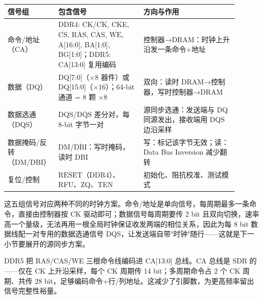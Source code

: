 \begin{longtable}{L{0.14\linewidth}L{0.36\linewidth}L{0.4\linewidth}}
\toprule
信号组 & 包含信号 & 方向与作用 \\
\midrule
命令/地址（CA） & DDR4: CK/$\overline{\text{CK}}$, CKE, $\overline{\text{CS}}$, $\overline{\text{RAS}}$, $\overline{\text{CAS}}$, $\overline{\text{WE}}$, A[16:0], BA[1:0], BG[1:0]；DDR5: CA[13:0] 复用编码 & 控制器→DRAM：时钟上升沿发一条命令+地址 \\
数据（DQ） & DQ[7:0]（$\times$8 器件）或 DQ[15:0]（$\times$16）；64-bit 通道 = 8 颗 $\times$8 & 双向：读时 DRAM→控制器，写时控制器→DRAM \\
数据选通（DQS） & DQS/$\overline{\text{DQS}}$ 差分对，每 8-bit 字节一对 & 源同步选通：发送端与 DQ 同源发出，接收端用 DQS 边沿采样 \\
数据掩码/反转（DM/DBI） & DM/$\overline{\text{DBI}}$：写时掩码，读时 DBI & 写：标记该字节无效；读：Data Bus Inversion 减少翻转 \\
复位/控制 & $\overline{\text{RESET}}$（DDR4）、RFU、ZQ、TEN & 初始化、阻抗校准、测试模式 \\
\bottomrule
\end{longtable}

这五组信号对应两种不同的时钟方案。命令/地址是单向信号，每周期最多一条命令，直接由控制器按 CK 驱动即可；数据信号每周期要传 2 bit 且双向切换，速率高一个量级，无法再用一根全局时钟保证收发两端的相位关系，因此为每 8 bit 数据线配一对专用的数据选通信号 DQS，让发送端自带"时钟"随行——这就是下一小节要展开的源同步方案。

DDR5 把 RAS/CAS/WE 三根命令线编码进 CA[13:0] 总线。CA 总线是 SDR 的——仅在 CK 上升沿采样，每个 CK 周期传 14 bit；多周期命令占 2 个 CK 周期、共传 28 bit，足够编码命令+行/列地址。这减少了引脚数，为更高频率留出信号完整性裕量。

